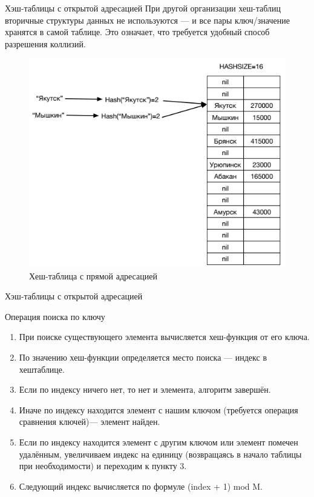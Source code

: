 \documentclass{beamer}
\begin{document}
\begin{frame}{Хэш-таблицы с открытой адресацией}
    При другой организации хеш-таблиц вторичные структуры данных не используются — и все пары ключ/значение хранятся в самой таблице. Это означает, что требуется удобный способ разрешения коллизий. 
	\begin{figure}[h]
		\centering
		\includegraphics[scale=0.6]{images/lec08-pic15.png}
		\caption{Хеш-таблица с прямой адресацией}
	\end{figure}
\end{frame}

\begin{frame}{Хэш-таблицы с открытой адресацией}
    \begin{block}{Операция поиска по ключу}
        \begin{enumerate}
            \item При поиске существующего элемента вычисляется хеш-функция от его ключа.
            \item По значению хеш-функции определяется место поиска — индекс в хештаблице.
            \item Если по индексу ничего нет, то нет и элемента, алгоритм завершён.
            \item Иначе по индексу находится элемент с нашим ключом (требуется операция сравнения ключей)— элемент найден.
            \item Если по индексу находится элемент с другим ключом или элемент помечен удалённым, увеличиваем индекс на единицу (возвращаясь в начало таблицы при необходимости) и переходим к пункту 3.
            \item Следующий индекс вычисляется по формуле (index + 1) mod M.
        \end{enumerate}
    \end{block}
\end{frame} 
\end{document}
